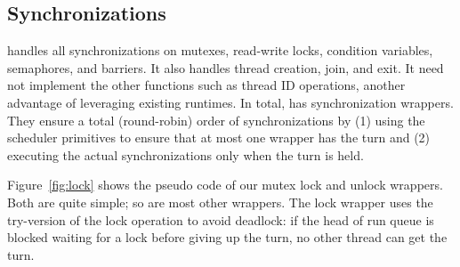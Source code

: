 \subsection{Synchronizations} \label{sec:sync}



\xxx handles all synchronizations on \pthread mutexes, read-write
locks, condition variables, semaphores, and barriers. It also handles thread
creation, join, and exit.  It need not implement the other \pthread
functions such as thread ID operations, another advantage of leveraging
existing \pthread runtimes. In total, \xxx has \npthreadsync synchronization
wrappers.  They ensure a total (round-robin) order of synchronizations by
(1) using the scheduler primitives to ensure that at most one wrapper has
the turn and (2) executing the actual synchronizations only when the turn
is held.



Figure~\ref{fig:lock} shows the pseudo code of our \pthread mutex lock and
unlock wrappers.  Both are quite simple; so are most other wrappers.  The
lock wrapper uses the try-version of the \pthread lock operation to avoid
deadlock: if the head of run queue is blocked waiting for a lock before
giving up the turn, no other thread can get the turn.

